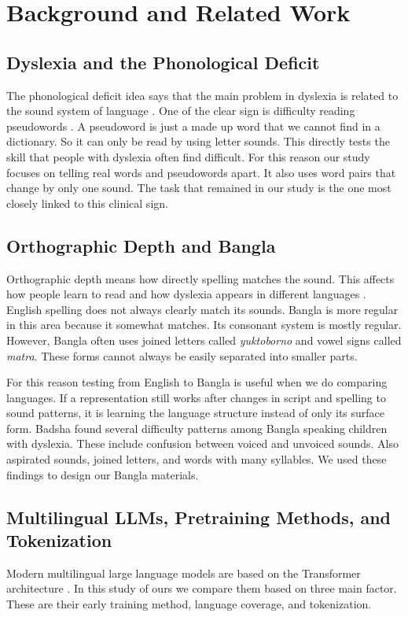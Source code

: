 \documentclass[preprint,12pt,authoryear]{elsarticle}
\begin{document}
\section{Background and Related Work}
\label{sec:related}

\subsection{Dyslexia and the Phonological Deficit}
The phonological deficit idea says that the main problem in dyslexia is related to the sound system of language \citep{snowling2020dyslexia,goswami2011temporal}. One of the clear sign is difficulty reading pseudowords \citep{rack1992nonword}. A pseudoword is just a made up word that we cannot find in a dictionary. So it can only be read by using letter sounds. This directly tests the skill that people with dyslexia often find difficult. For this reason our study focuses on telling real words and pseudowords apart. It also uses word pairs that change by only one sound. The task that remained in our study is the one most closely linked to this clinical sign.

\subsection{Orthographic Depth and Bangla}
Orthographic depth means how directly spelling matches the sound. This affects how people learn to read and how dyslexia appears in different languages \citep{ziegler2005reading}. English spelling does not always clearly match its sounds. Bangla is more regular in this area because it somewhat matches. Its consonant system is mostly regular. However, Bangla often uses joined letters called \textit{yuktoborno} and vowel signs called \textit{matra}. These forms cannot always be easily separated into smaller parts.

For this reason testing from English to Bangla is useful when we do comparing languages. If a representation still works after changes in script and spelling to sound patterns, it is learning the language structure instead of only its surface form. Badsha \citeyearpar{badsha2024mall} found several difficulty patterns among Bangla speaking children with dyslexia. These include confusion between voiced and unvoiced sounds. Also aspirated sounds, joined letters, and words with many syllables. We used these findings to design our Bangla materials.

\subsection{Multilingual LLMs, Pretraining Methods, and Tokenization}
Modern multilingual large language models are based on the Transformer architecture \citep{vaswani2017attention}. In this study of ours we compare them based on three main factor. These are their early training method, language coverage, and tokenization.
\end{document}
